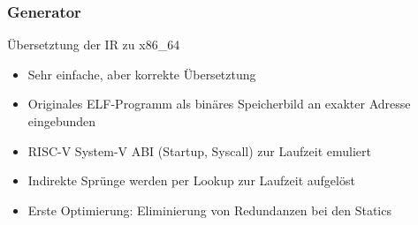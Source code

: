 \begin{frame}

    \frametitle{Generator}{Übersetztung der IR zu x86\_64}
    \begin{itemize}
        \setlength{\itemsep}{1em}
        \item Sehr einfache, aber korrekte Übersetztung
        \item Originales ELF-Programm als binäres Speicherbild an exakter Adresse eingebunden
        \item RISC-V System-V ABI (Startup, Syscall) zur Laufzeit emuliert
        \item Indirekte Sprünge werden per Lookup zur Laufzeit aufgelöst
        \item Erste Optimierung: Eliminierung von Redundanzen bei den Statics
    \end{itemize}
\end{frame}
\clearpage



